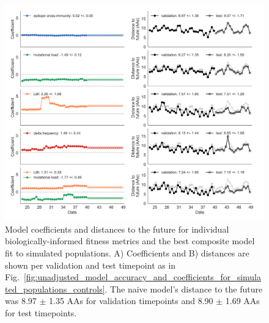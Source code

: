 \begin{figure}[ht!]
  \begin{center}
  \includegraphics[width=\textwidth]{figures/unadjusted-model-accuracy-and-coefficients-for-simulated-populations.png}
  \caption{
    Model coefficients and distances to the future for individual biologically-informed fitness metrics and the best composite model fit to simulated populations.
    A) Coefficients and B) distances are shown per validation and test timepoint as in Fig.~\ref{fig:unadjusted_model_accuracy_and_coefficients_for_simulated_populations_controls}.
    The naive model's distance to the future was 8.97 $\pm$ 1.35 AAs for validation timepoints and 8.90 $\pm$ 1.69 AAs for test timepoints.
  }
  \label{fig:unadjusted_model_accuracy_and_coefficients_for_simulated_populations}
  \end{center}
\end{figure}

